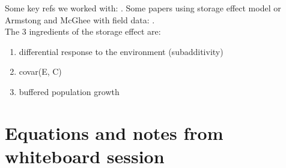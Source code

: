 \documentclass[11pt,a4paper,oneside]{article}
\begin{document}
\noindent Some key refs we worked with:
\citep{Chesson:1993gi,Chesson:2000ak,Chesson:2000vd,Chesson:2004eo}. Some
papers using storage effect model or Armstong and McGhee with field data: \citep{Angert:2009ng,Kuang:2008ri,Kuang:2009rj,Levine:2009ym}.
\\
\noindent The 3 ingredients of the storage effect are:
\begin{enumerate}
\item differential response to the environment (subadditivity)
\item covar(E, C)
\item buffered population growth
\end{enumerate}

\newpage
\section{Equations and notes from whiteboard session}
\end{document}
